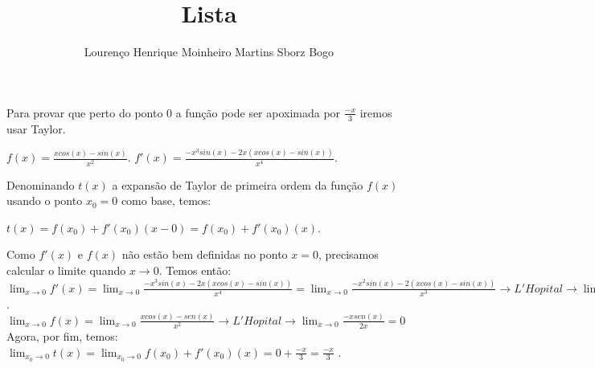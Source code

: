 \documentclass[12pt]{article}
\title{Lista}
\author{Lourenço Henrique Moinheiro Martins Sborz Bogo}
\date{}
\begin{document}
\maketitle

Para provar que perto do ponto $0$ a função pode ser apoximada por $\frac{-x}{3}$ iremos usar Taylor.

$f(x) = \frac{xcos(x) - sin(x)}{x^2}$.
$f'(x) = \frac{-x^3sin(x) - 2x(xcos(x)-sin(x))}{x^4}$.

Denominando $t(x)$ a expansão de Taylor de primeira ordem da função $f(x)$ usando o ponto $x_0 = 0$ como base, temos:

$t(x) = f(x_0) + f'(x_0)(x - 0) = f(x_0) + f'(x_0)(x)$.

Como $f'(x)$ e $f(x)$ não estão bem definidas no ponto $x = 0$, precisamos calcular o limite quando $x \to 0$. Temos então:
\\

$\displaystyle\lim_{x \to 0}f'(x) = \displaystyle\lim_{x \to 0}\frac{-x^3sin(x) - 2x(xcos(x)-sin(x))}{x^4} = \displaystyle\lim_{x \to 0}\frac{-x^2sin(x) - 2(xcos(x)-sin(x))}{x^3} \rightarrow L'Hopital \rightarrow \displaystyle\lim_{x \to 0}\frac{-2xsin(x)-2x^2cos(x)+2xsen(x)}{3x^2} = \displaystyle\lim_{x \to 0}\frac{-2xsin(x)-2x^2cos(x)+2xsen(x)}{3x^2} = \displaystyle\lim_{x \to 0}\frac{-x^2cos(x)}{3x^2} = \frac{-1}{3}$.
\\

$\displaystyle\lim_{x \to 0}f(x) = \displaystyle\lim_{x \to 0}\frac{xcos(x)-sen(x)}{x^2} \rightarrow L'Hopital \rightarrow \displaystyle\lim_{x \to 0}\frac{-xsen(x)}{2x} = 0$
\\

Agora, por fim, temos:
\\

$\displaystyle\lim_{x_0 \to 0}t(x) = \displaystyle\lim_{x_0 \to 0}f(x_0) + f'(x_0)(x) = 0 + \frac{-x}{3} = \frac{-x}{3}$
.
\end{document}
